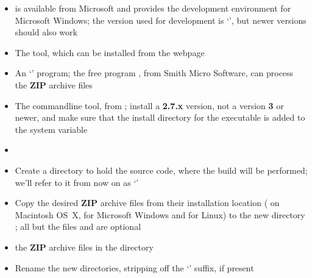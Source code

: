 \begin{itemize}
\item{} is available from Microsoft and provides the 
development environment for Microsoft Windows; the version used for development is
`', but newer versions should also work
\item\exSp{} The  tool, which can be installed from the web\longDash{}page
\item\exSp{} An `' program; the free program , from
%
{Smith Micro Software}, can process the \textbf{ZIP} archive files
\item\exSp{} The  command\longDash{}line tool, from
; install a \textbf{2.7.x}
version, not a version \textbf{3} or newer, and make sure that the install directory for
the executable is added to the system  variable
\end{itemize}
\tertiaryEnd
{}
\begin{itemize}
\item\TBD
\end{itemize}
\tertiaryEnd
\secondaryEnd
{}
\begin{itemize}
\item Create a directory to hold the source code, where the build will be performed; we'll
refer to it from now on as `'
\item\exSp{} Copy the desired \textbf{ZIP} archive files from their installation location
( on Macintosh OS~X, \TBD{} for Microsoft Windows and \TBD{} for
Linux) to the new directory ; all but the files
 and  are optional
\item\exSp{} the \textbf{ZIP} archive files in the directory 
\item\exSp{} Rename the new directories, stripping off the `' suffix, if
present
\end{itemize}
